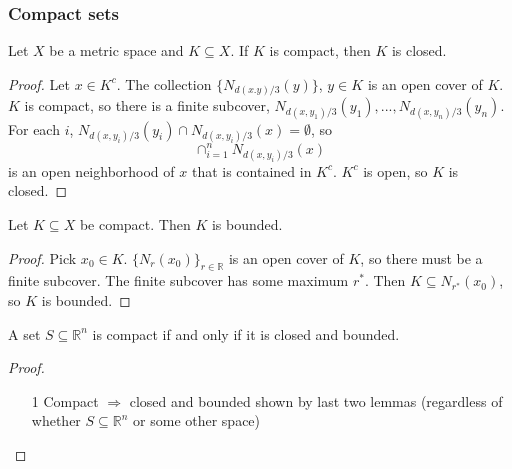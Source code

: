 \documentclass[compress]{beamer}
\def\R{\mathbb{R}}
\begin{document}
\begin{frame} 
  \frametitle{Compact sets}
  \begin{lemma}
    Let $X$ be a metric space and $K \subseteq X$. If $K$ is compact,
    then $K$ is closed.
  \end{lemma}
  \begin{proof}
    Let $x \in K^c$. The collection $\{N_{d(x.y)/3}(y)\}$, $y\in K$ is an
    open cover of $K$. $K$ is compact, so there is a finite subcover,
    $N_{d(x,y_1)/3}(y_1), ... , N_{d(x,y_n)/3}(y_n)$.  For each $i$,
    $N_{d(x,y_i)/3}(y_i) \cap N_{d(x,y_i)/3}(x) = \emptyset$, so 
    \[ \cap_{i=1}^n N_{d(x,y_i)/3}(x) \]
    is an open neighborhood of $x$ that is contained in $K^c$. $K^c$ is
    open, so $K$ is closed.
  \end{proof}
\end{frame}

\begin{frame}
  \begin{lemma}
    Let $K \subseteq X$ be compact. Then $K$ is bounded. 
  \end{lemma}
  \begin{proof}
    Pick $x_0 \in K$. $\{N_{r}(x_0) \}_{r \in \R}$ is an open cover of
    $K$, so there must be a finite subcover. The finite subcover has
    some maximum $r^*$. Then $K \subseteq N_{r^*}(x_0)$, so $K$ is bounded.
  \end{proof}
\end{frame}

\begin{frame}
  \begin{theorem}\label{thm:hb}
    A set $S \subseteq \R^n$ is compact if and only if it is closed and
    bounded. 
  \end{theorem}
  \begin{proof}
    \begin{itemize}
    \item[1] Compact $\Rightarrow$ closed and bounded shown by last
      two lemmas (regardless of whether $S \subseteq \R^n$ or some
      other space)
    \end{itemize}
  \end{proof}
\end{frame}
\end{document}
